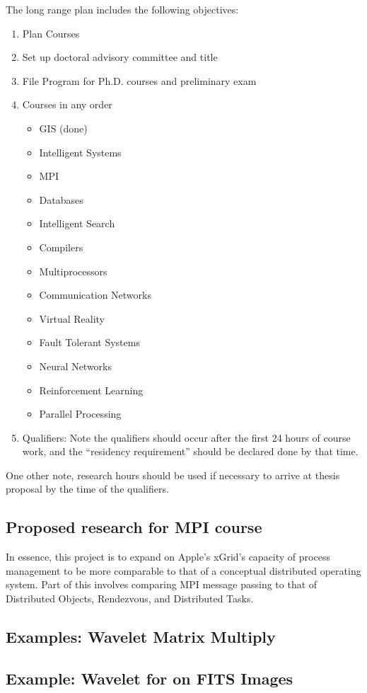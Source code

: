 \documentclass[11pt]{article}
\begin{document}
The long range plan includes the following objectives:
\begin{enumerate}
\item Plan Courses
\item Set up doctoral advisory committee and title
\item File Program for Ph.D. courses and preliminary exam
\item Courses in any order
\begin{itemize}
\item GIS (done)
\item Intelligent Systems
\item MPI
\item Databases 
\item Intelligent Search 
\item Compilers 
\item Multiprocessors 
\item Communication Networks
\item Virtual Reality 
\item Fault Tolerant Systems
\item Neural Networks
\item Reinforcement Learning
\item Parallel Processing
\end{itemize}
\item Qualifiers:  Note the qualifiers should occur after the first 24 hours of course work, and the ``residency requirement'' should be declared done by that time.  
\end{enumerate}
One other note, research hours should be used if necessary to arrive at thesis proposal by the time of the qualifiers.  

\subsection {Proposed research for MPI course}
In essence, this project is to expand on Apple's xGrid's capacity of process management to be more comparable to that of a conceptual distributed operating system.   Part of this involves comparing MPI message passing to that of Distributed Objects, Rendezvous, and Distributed Tasks.    


\subsection {Examples: Wavelet Matrix Multiply}

\subsection {Example: Wavelet for on FITS Images}
\end{document}
